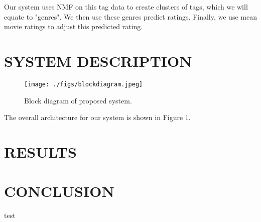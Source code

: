 \documentclass[letterpaper, 10 pt, conference]{ieeeconf}  %
\begin{document}
Our system uses NMF on this tag data to create clusters of tags, which we will equate to "genres". We then use these genres predict ratings. Finally, we use mean movie ratings to adjust this predicted rating.


\section{SYSTEM DESCRIPTION}

\begin{figure}[h]
   \texttt{[image: ./figs/blockdiagram.jpeg]}
   \caption{Block diagram of proposed system.}
\end{figure}


The overall architecture for our system is shown in Figure 1.


\section{RESULTS}

\section{CONCLUSION}



\begin{thebibliography}{99}
    test


\end{thebibliography}
\end{document}
